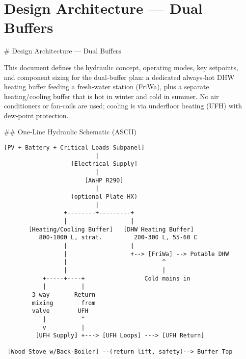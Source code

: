 \documentclass[11pt,oneside]{report}
\begin{document}
\chapter{Design Architecture — Dual Buffers}
\begin{markdown}
# Design Architecture — Dual Buffers

This document defines the hydraulic concept, operating modes, key setpoints, and component sizing for the dual‑buffer plan: a dedicated always‑hot DHW heating buffer feeding a fresh‑water station (FriWa), plus a separate heating/cooling buffer that is hot in winter and cold in summer. No air conditioners or fan‑coils are used; cooling is via underfloor heating (UFH) with dew‑point protection.

## One‑Line Hydraulic Schematic (ASCII)

\end{markdown}
\begin{Verbatim}[fontsize=\small]
           [PV + Battery + Critical Loads Subpanel]
                          |
                   [Electrical Supply]
                          |
                       [AWHP R290]
                          |
                   (optional Plate HX)
                          |
                 +--------+---------+
                 |                  |
       [Heating/Cooling Buffer]   [DHW Heating Buffer]
          800-1000 L, strat.         200-300 L, 55-60 C
                 |                  |
                 |                  +--> [FriWa] --> Potable DHW
                 |                           ^
                 |                           |
           +-----+----+                 Cold mains in
           |          |
        3-way       Return
        mixing        from
        valve        UFH
           |          ^
           v          |
         [UFH Supply] +---> [UFH Loops] ---> [UFH Return]

 [Wood Stove w/Back-Boiler] --(return lift, safety)--> Buffer Top
\end{Verbatim}
\end{document}
